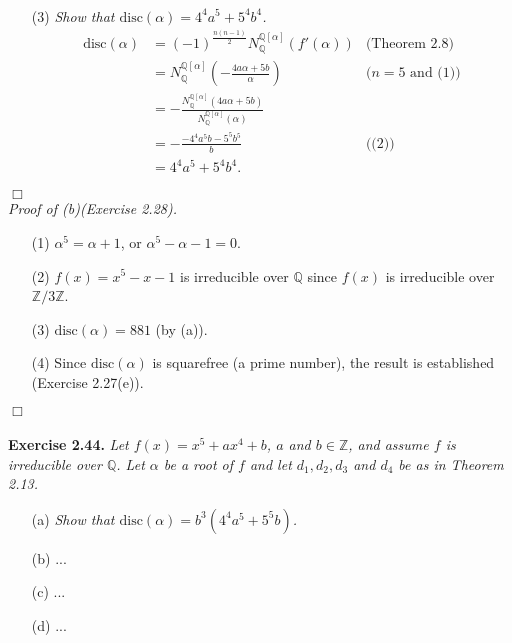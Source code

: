 \documentclass{article}
\begin{document}
\begin{enumerate}
\begin{enumerate}
\begin{align*}
  \end{align*}
  \end{enumerate}
\item[(3)]
\emph{Show that $\text{disc}(\alpha) = 4^4 a^5 + 5^4 b^4$.}
\begin{align*}
\text{disc}(\alpha)
&= (-1)^{\frac{n(n-1)}{2}} N_{\mathbb{Q}}^{\mathbb{Q}[\alpha]}(f'(\alpha))
  &\text{(Theorem 2.8)} \\
&= N_{\mathbb{Q}}^{\mathbb{Q}[\alpha]}\left( -\frac{4a\alpha+5b}{\alpha} \right)
  &\text{($n=5$ and (1))} \\
&= -\frac{N_{\mathbb{Q}}^{\mathbb{Q}[\alpha]}(4a\alpha+5b)}
  {N_{\mathbb{Q}}^{\mathbb{Q}[\alpha]}(\alpha)} \\
&= - \frac{-4^4a^5b-5^5b^5}{b}
  &\text{((2))} \\
&= 4^4 a^5 + 5^4 b^4.
\end{align*}
\end{enumerate}
$\Box$ \\

\emph{Proof of (b)(Exercise 2.28).}
\begin{enumerate}
\item[(1)]
$\alpha^5 = \alpha + 1$, or $\alpha^5 - \alpha - 1 = 0$.
\item[(2)]
$f(x) = x^5 - x - 1$ is irreducible over $\mathbb{Q}$
since $f(x)$ is irreducible over $\mathbb{Z}/3\mathbb{Z}$.
\item[(3)]
$\text{disc}(\alpha) = 881$ (by (a)).
\item[(4)]
Since $\text{disc}(\alpha)$ is squarefree (a prime number),
the result is established (Exercise 2.27(e)).
\end{enumerate}
$\Box$ \\\\






\textbf{Exercise 2.44.}
\emph{Let $f(x) = x^5+ax^4+b$, $a$ and $b \in \mathbb{Z}$,
and assume $f$ is irreducible over $\mathbb{Q}$.
Let $\alpha$ be a root of $f$ and
let $d_1, d_2, d_3$ and $d_4$ be as in Theorem 2.13. }
\begin{enumerate}
\item[(a)]
\emph{Show that $\text{disc}(\alpha) = b^3(4^4 a^5 + 5^5 b)$.}
\item[(b)]
...
\item[(c)]
...
\item[(d)]
... \\
\end{enumerate}
\end{document}

